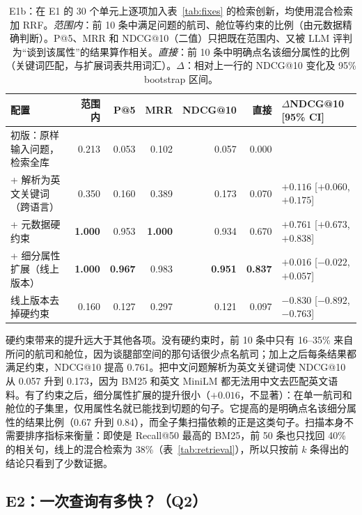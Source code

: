 \documentclass[10pt,twocolumn,a4paper]{article}
\newcommand{\best}[1]{\textbf{#1}}
\begin{document}
\begin{table}[t]
\centering\small
\caption{E1b：在 E1 的 30 个单元上逐项加入表~\ref{tab:fixes} 的检索创新，均使用混合检索加 RRF。\emph{范围内}：前 10 条中满足问题的航司、舱位等约束的比例（由元数据精确判断）。P@5、MRR 和 NDCG@10（二值）只把既在范围内、又被 LLM 评判为“谈到该属性”的结果算作相关。\emph{直接}：前 10 条中明确点名该细分属性的比例（关键词匹配，与扩展词表共用词汇）。$\Delta$：相对上一行的 NDCG@10 变化及 95\% bootstrap 区间。}
\label{tab:innov}
\begin{tabular}{@{}lrrrrrl@{}}
\toprule
\textbf{配置} & \textbf{范围内} & \textbf{P@5} & \textbf{MRR} & \textbf{NDCG@10} & \textbf{直接} & \textbf{$\Delta$NDCG@10 [95\% CI]} \\
\midrule
初版：原样输入问题，检索全库 & 0.213 & 0.053 & 0.102 & 0.057 & 0.000 & \\
+ 解析为英文关键词（跨语言） & 0.350 & 0.160 & 0.389 & 0.173 & 0.070 & $+0.116$ [$+0.060$, $+0.175$] \\
+ 元数据硬约束 & \best{1.000} & 0.953 & \best{1.000} & 0.934 & 0.670 & $+0.761$ [$+0.673$, $+0.838$] \\
\rowcolor{shade} + 细分属性扩展（线上版本） & \best{1.000} & \best{0.967} & 0.983 & \best{0.951} & \best{0.837} & $+0.016$ [$-0.022$, $+0.057$] \\
\midrule
线上版本去掉硬约束 & 0.160 & 0.127 & 0.297 & 0.121 & 0.097 & $-0.830$ [$-0.892$, $-0.763$] \\
\bottomrule
\end{tabular}
\end{table}

硬约束带来的提升远大于其他各项。没有硬约束时，前 10 条中只有 16--35\% 来自所问的航司和舱位，因为谈腿部空间的那句话很少点名航司；加上之后每条结果都满足约束，NDCG@10 提高 0.761。把中文问题解析为英文关键词使 NDCG@10 从 0.057 升到 0.173，因为 BM25 和英文 MiniLM 都无法用中文去匹配英文语料。有了约束之后，细分属性扩展的提升很小（$+0.016$，不显著）：在单一航司和舱位的子集里，仅用属性名就已能找到切题的句子。它提高的是明确点名该细分属性的结果比例（0.67 升到 0.84），而全子集扫描依赖的正是这类句子。扫描本身不需要排序指标来衡量：即使是 Recall@50 最高的 BM25，前 50 条也只找回 40\% 的相关句，线上的混合检索为 38\%（表~\ref{tab:retrieval}），所以只按前 $k$ 条得出的结论只看到了少数证据。

\subsection{E2：一次查询有多快？（Q2）}
\label{sec:exp-speed}
\end{document}
